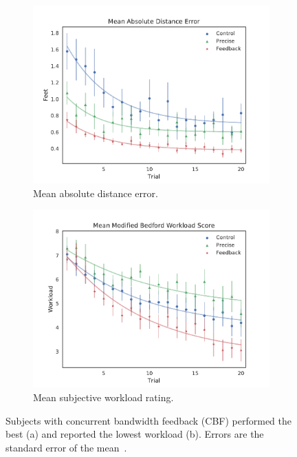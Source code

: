 \begin{figure}[p]
    \begin{center}
        \begin{subfigure}{0.8\linewidth}
            \includegraphics[width=\linewidth]{figures/AR/Group_absDistErr_clean_fit_30.png}
            \caption[Mean absolute distance error]{Mean absolute distance error.}
            \label{figure:saferdistance}
        \end{subfigure}\hfill
        \begin{subfigure}{0.8\linewidth}
            \includegraphics[width=\linewidth]{figures/AR/Group_Workload_fit_30.png}
            \caption[Mean subjective workload rating]{Mean subjective workload rating.}
            \label{figure:saferworkload}
        \end{subfigure}
        \caption[Performance and workload benefits from feedback]{Subjects with concurrent bandwidth feedback (CBF) performed the best (a) and reported the lowest workload (b). Errors are the standard error of the mean~\citep{karasinski_real-time_2016}.}
    \end{center}
\end{figure}

